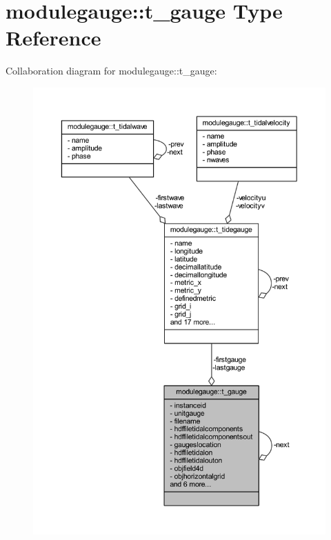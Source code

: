 \hypertarget{structmodulegauge_1_1t__gauge}{}\section{modulegauge\+:\+:t\+\_\+gauge Type Reference}
\label{structmodulegauge_1_1t__gauge}


Collaboration diagram for modulegauge\+:\+:t\+\_\+gauge\+:\nopagebreak
\begin{figure}[H]
\begin{center}
\leavevmode
\includegraphics[width=350pt]{structmodulegauge_1_1t__gauge__coll__graph}
\end{center}
\end{figure}

